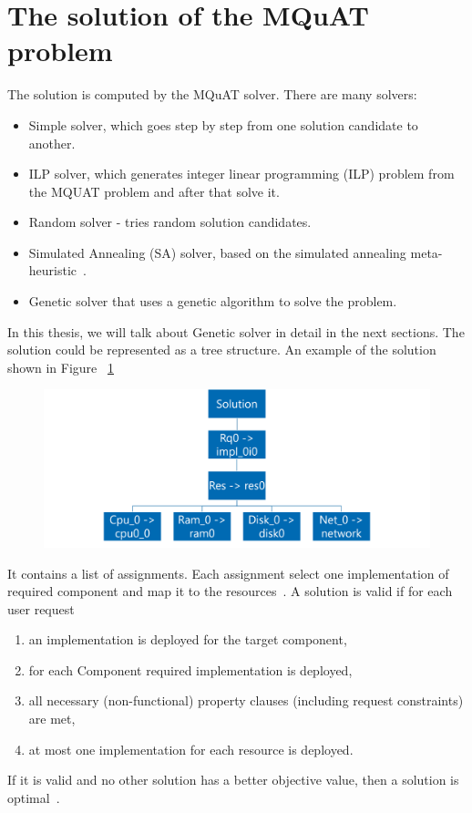 \section{The solution of the MQuAT problem}
The solution is computed by the MQuAT solver. There are many solvers:
\begin{itemize}
	\item Simple solver, which goes step by step from one solution candidate to another.
	\item ILP solver, which generates integer linear programming (ILP) problem from the MQUAT problem and after that solve it.
	\item Random solver - tries random solution candidates.
	\item Simulated Annealing (SA) solver, based on the simulated annealing meta-heuristic~\cite{pukhkaiev19}.
	\item Genetic solver that uses a genetic algorithm to solve the problem.
\end{itemize}
In this thesis, we will talk about Genetic solver in detail in the next sections.
The solution could be represented as a tree structure. An example of the solution shown in Figure ~\ref{fig:SolutionModel}
\begin{figure}
	\centering
	\includegraphics[width=\textwidth]{images/MQuATSolutionModel.png}
	\caption{}
	\label{fig:SolutionModel}
\end{figure}
It contains a list of assignments. Each assignment select one implementation of required component and map it to the resources~\cite{gotz18}.
A solution is valid if for each user request
\begin{enumerate}
	\item an implementation is deployed for the target component,
	\item for each Component required implementation is deployed,
	\item all necessary (non-functional) property clauses (including request constraints) are met,
	\item at most one implementation for each resource is deployed.
\end{enumerate}
If it is valid and no other solution has a better objective value, then a solution is optimal~\cite{gotz18}.


